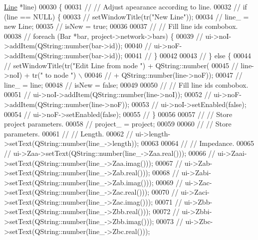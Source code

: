 \begin{DoxyCode}
      \hyperlink{class_line}{Line} *line)
00030 \{
00031 \textcolor{comment}{//  // Adjust apearance according to line.}
00032 \textcolor{comment}{//  if (line == NULL) \{}
00033 \textcolor{comment}{//    setWindowTitle(tr("New Line"));}
00034 \textcolor{comment}{//    line\_ = new Line;}
00035 \textcolor{comment}{//    isNew = true;}
00036 
00037 \textcolor{comment}{//    // Fill line ids combobox.}
00038 \textcolor{comment}{//    foreach (Bar *bar, project->network->bars) \{}
00039 \textcolor{comment}{//      ui->noI->addItem(QString::number(bar->id));}
00040 \textcolor{comment}{//      ui->noF->addItem(QString::number(bar->id));}
00041 \textcolor{comment}{//    \}}
00042 
00043 \textcolor{comment}{//  \} else \{}
00044 \textcolor{comment}{//    setWindowTitle(tr("Edit Line from node ") + QString::number(}
00045 \textcolor{comment}{//                     line->noI) + tr(" to node ") \(\backslash\)}
00046 \textcolor{comment}{//                   + QString::number(line->noF));}
00047 \textcolor{comment}{//    line\_ = line;}
00048 \textcolor{comment}{//    isNew = false;}
00049 
00050 \textcolor{comment}{//    // Fill line ids combobox.}
00051 \textcolor{comment}{//    ui->noI->addItem(QString::number(line->noI));}
00052 \textcolor{comment}{//    ui->noF->addItem(QString::number(line->noF));}
00053 \textcolor{comment}{//    ui->noI->setEnabled(false);}
00054 \textcolor{comment}{//    ui->noF->setEnabled(false);}
00055 \textcolor{comment}{//  \}}
00056 
00057 \textcolor{comment}{//  // Store project parameters.}
00058 \textcolor{comment}{//  project\_ = project;}
00059 
00060 \textcolor{comment}{//  // Store parameters.}
00061 \textcolor{comment}{//  // Length.}
00062 \textcolor{comment}{//  ui->length->setText(QString::number(line\_->length));}
00063 
00064 \textcolor{comment}{//  // Impedance.}
00065 \textcolor{comment}{//  ui->Zaa->setText(QString::number(line\_->Zaa.real()));}
00066 \textcolor{comment}{//  ui->Zaai->setText(QString::number(line\_->Zaa.imag()));}
00067 \textcolor{comment}{//  ui->Zab->setText(QString::number(line\_->Zab.real()));}
00068 \textcolor{comment}{//  ui->Zabi->setText(QString::number(line\_->Zab.imag()));}
00069 \textcolor{comment}{//  ui->Zac->setText(QString::number(line\_->Zac.real()));}
00070 \textcolor{comment}{//  ui->Zaci->setText(QString::number(line\_->Zac.imag()));}
00071 \textcolor{comment}{//  ui->Zbb->setText(QString::number(line\_->Zbb.real()));}
00072 \textcolor{comment}{//  ui->Zbbi->setText(QString::number(line\_->Zbb.imag()));}
00073 \textcolor{comment}{//  ui->Zbc->setText(QString::number(line\_->Zbc.real()));}

\end{DoxyCode}
